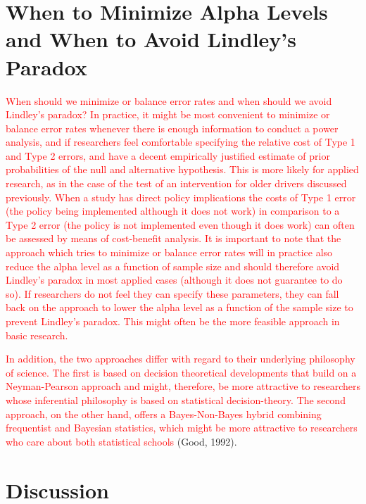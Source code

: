 \documentclass[
  english,
  ,man, a4paper,floatsintext]{apa6}
\begin{document}
\hypertarget{when-to-minimize-alpha-levels-and-when-to-avoid-lindleys-paradox}{%
\section{When to Minimize Alpha Levels and When to Avoid Lindley's Paradox}\label{when-to-minimize-alpha-levels-and-when-to-avoid-lindleys-paradox}}

\textcolor{red}{When should we minimize or balance error rates and when should we avoid Lindley's paradox? In practice, it might be most convenient to minimize or balance error rates whenever there is enough information to conduct a power analysis, and if researchers feel comfortable specifying the relative cost of Type 1 and Type 2 errors, and have a decent empirically justified estimate of prior probabilities of the null and alternative hypothesis. This is more likely for applied research, as in the case of the test of an intervention for older drivers discussed previously. When a study has direct policy implications the costs of Type 1 error (the policy being implemented although it does not work) in comparison to a Type 2 error (the policy is not implemented even though it does work) can often be assessed by means of cost-benefit analysis. It is important to note that the approach which tries to minimize or balance error rates will in practice also reduce the alpha level as a function of sample size and should therefore avoid Lindley’s paradox in most applied cases (although it does not guarantee to do so). If researchers do not feel they can specify these parameters, they can fall back on the approach to lower the alpha level as a function of the sample size to prevent Lindley’s paradox. This might often be the more feasible approach in basic research.}

\textcolor{red}{In addition, the two approaches differ with regard to their underlying philosophy of science. The first is based on decision theoretical developments that build on a Neyman-Pearson approach and might, therefore, be more attractive to researchers whose inferential philosophy is based on statistical decision-theory. The second approach, on the other hand, offers a Bayes-Non-Bayes hybrid combining frequentist and Bayesian statistics, which might be more attractive to researchers who care about both statistical schools} (Good, 1992).

\hypertarget{discussion}{%
\section{Discussion}\label{discussion}}
\end{document}
